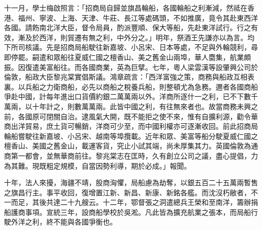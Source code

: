 \begin{pinyinscope}
十一月，學士梅啟照言：「招商局自歸並旗昌輪船，各國輪船之利漸減，然祗在香港、福州、寧波、上海、天津、牛莊、長江等處碼頭，不如推廣，竟令其赴東西洋各國。請飭南北洋大臣，督令局員，酌派豐順、保大等船，先赴東洋試行。行之有效，漸及於西洋，則貿遷有無之利，中外分之。」明年，祭酒王先謙亦以為言。均下所司核議。先是招商局船駛往新嘉坡、小呂宋、日本等處，不足與外輪競利，尋即停罷。嗣遣和眾船往夏威仁國之檀香山、美之舊金山兩埠，華人麕集，航業頗振。因復遣美富船往。而各國商業，英為巨擘。七年，粵人梁雲漢等設肇興公司於倫敦，船政大臣黎兆棠實倡斯議。鴻章疏言：「西洋富強之策，商務與船政互相表裏。以兵船之力衛商船，必先以商船之稅養兵船，則整頓尤為急務。邇者各國商船爭赴中國，計每年進出口貨價約銀二萬萬兩以外。洋商所逐什一之利，已不下數千萬兩，以十年計之，則數萬萬兩。此皆中國之利，有往無來者也。故當商務未興之前，各國原可閉關自治。逮風氣大開，既不能拒之使不來，惟有自擴利源，勸令華商出洋貿易，庶土貨可暢銷，洋商可少至，而中國利權亦可逐漸收回。前此招商局輪船嘗駛往新嘉坡、小呂宋、越南等埠攬載。近年和眾、美富等船分駛夏威仁國之檀香山、美國之舊金山，載運客貨，究止小試其端，尚未厚集其力。英國倫敦為通商第一都會，並無華商前往。黎兆棠志在匡時，久有創立公司之議，盡心提倡，力為其難。現既粗定規模，自當因勢利導，期於必成。」報聞。

十年，法人來擾，海疆不靖，股商洶懼，局船慮為劫奪，以銀五百二十五萬兩暫售之旗昌行主。事平收回，復增置江新、新昌、新康、新銘各艦。而沈沒朽敝者，不一而足，其後共達二十九艘云。十二年，鄂督張之洞遣總兵王榮和至南洋，籌辦捐船護商事項。宣統三年，設商船學校於吳淞。凡此皆為擴充航業之張本，而局船行駛外洋之利，終不能與各國爭衡也。


\end{pinyinscope}
